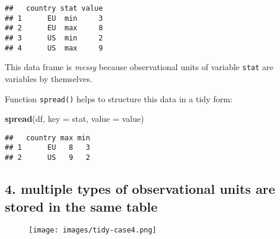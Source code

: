 \documentclass[]{book}
\newenvironment{Shaded}{\begin{snugshade}}{\end{snugshade}}
\newcommand{\KeywordTok}[1]{\textcolor[rgb]{0.13,0.29,0.53}{\textbf{{#1}}}}
\newcommand{\DataTypeTok}[1]{\textcolor[rgb]{0.13,0.29,0.53}{{#1}}}
\newcommand{\NormalTok}[1]{{#1}}
\begin{document}
\begin{verbatim}
##   country stat value
## 1      EU  min     3
## 2      EU  max     8
## 3      US  min     2
## 4      US  max     9
\end{verbatim}

This data frame is \emph{messy} because observational units of variable
\texttt{stat} are variables by themselves.

Function \texttt{spread()} helps to structure this data in a tidy form:

\begin{Shaded}
\begin{Highlighting}[]
\KeywordTok{spread}\NormalTok{(df, }\DataTypeTok{key =} \NormalTok{stat, }\DataTypeTok{value =} \NormalTok{value)}
\end{Highlighting}
\end{Shaded}

\begin{verbatim}
##   country max min
## 1      EU   8   3
## 2      US   9   2
\end{verbatim}

\clearpage

\subsection{4. multiple types of observational units are stored in the
same
table}\label{multiple-types-of-observational-units-are-stored-in-the-same-table}

\begin{figure}[htbp]
\centering
\texttt{[image: images/tidy-case4.png]}
\caption{}
\end{figure}
\end{document}
